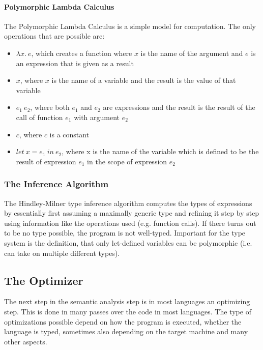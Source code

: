 \documentclass[12pt]{article}
\begin{document}
\paragraph{Polymorphic Lambda Calculus}
The Polymorphic Lambda Calculus is a simple model for computation.
The only operations that are possible are:
\begin{itemize}
      \item $\lambda x.\:e$,
            which creates a function where $x$ is the name of the argument
            and $e$ is an expression that is given as a result
      \item $x$, where $x$ is the name of a variable
            and the result is the value of that variable
      \item $e_1\:e_2$, where both $e_1$ and $e_2$ are expressions and the result
            is the result of the call of function $e_1$ with argument $e_2$\item $c$, where $c$ is a constant
      \item $let\:x = e_1\:in\:e_2$, where x is the name of the variable
            which is defined to be the result of expression $e_1$ in the scope of expression $e_2$\end{itemize}

\subsubsection{The Inference Algorithm}
The Hindley-Milner type inference algorithm computes the types of expressions
by essentially first assuming a maximally generic type and refining it step by step
using information like the operations used (e.g. function calls).
If there turns out to be no type possible, the program is not well-typed.
Important for the type system is the definition, that only let-defined variables
can be polymorphic (i.e. can take on multiple different types).

\subsection{The Optimizer}
The next step in the semantic analysis step is in most languages an optimizing step.
This is done in many passes over the code in most languages. The type of optimizations
possible depend on how the program is executed, whether the language is typed,
sometimes also depending on the target machine and many other aspects.
\end{document}
